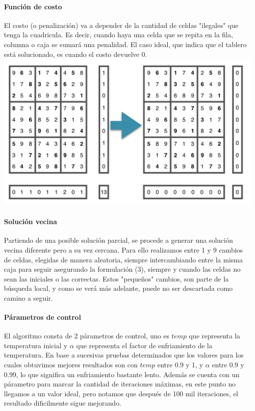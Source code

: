 \begin{center}
\end{center}
\paragraph{Función de costo}
El costo (o penalización) va a depender de la cantidad de celdas "ilegales" que tenga la cuadricula. Es decir, cuando haya una celda que se repita en la fila, columna o caja se sumará una penalidad. El caso ideal, que indica que el tablero está solucionado, es cuando el costo devuelve 0.\\
\includegraphics[scale=0.6]{imgs/costo.png}	
\paragraph{Solución vecina}
Partiendo de una posible solución parcial, se procede a generar una solución vecina diferente pero a su vez cercana. Para ello realizamos entre 1 y 9 cambios de celdas, elegidas de manera aleatoria, siempre intercambiando entre la misma caja para seguir asegurando la formulación (3), siempre y cuando las celdas no sean las iniciales o las correctas. Estos "pequeños" cambios, son parte de la búsqueda local, y como se verá más adelante, puede no ser descartada como camino a seguir.
\paragraph{Párametros de control}
El algoritmo consta de 2 párametros de control, uno es $temp$ que representa la temperatura inicial y $\alpha$ que representa el factor de enfriamiento de la temperatura. En base a sucesivas pruebas determinados que los valores para los cuales obtuvimos mejores resultados son con $temp$ entre 0.9 y 1, y $\alpha$ entre 0.9 y 0.99, lo que significa un enfriamiento bastante lento.
Además se cuenta con un párametro para marcar la cantidad de iteraciones máximas, en este punto no llegamos a un valor ideal, pero notamos que después de 100 mil iteraciones, el resultado dificilmente sigue mejorando.
